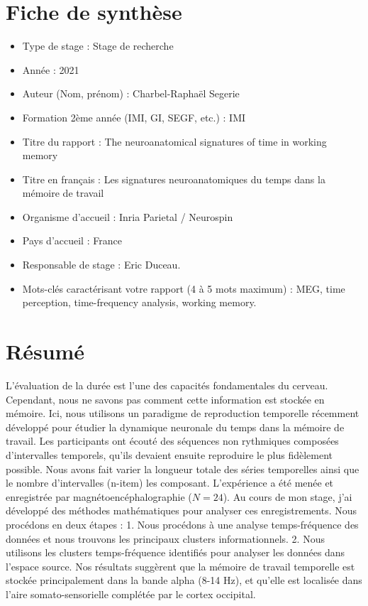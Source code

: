 \chapter*{\centering Fiche de synthèse}
\begin{itemize}
    \item Type de stage : Stage de recherche
    \item Année : 2021
    \item Auteur (Nom, prénom) : Charbel-Raphaël Segerie
    \item Formation 2ème année (IMI, GI, SEGF, etc.) : IMI
    \item Titre du rapport : The neuroanatomical signatures of time in working memory
    \item Titre en français : Les signatures neuroanatomiques du temps dans la mémoire de travail
    \item Organisme d’accueil : Inria Parietal / Neurospin
    \item Pays d’accueil : France
    \item Responsable de stage : Eric Duceau.
    \item Mots-clés caractérisant votre rapport (4 à 5 mots maximum) : MEG, time perception, time-frequency analysis, working memory.
\end{itemize}




\chapter*{\centering Résumé}

L'évaluation de la durée est l'une des capacités fondamentales du cerveau. Cependant, nous ne savons pas comment cette information est stockée en mémoire. Ici, nous utilisons un paradigme de reproduction temporelle récemment développé pour étudier la dynamique neuronale du temps dans la mémoire de travail. Les participants ont écouté des séquences non rythmiques composées d'intervalles temporels, qu'ils devaient ensuite reproduire le plus fidèlement possible. Nous avons fait varier la longueur totale des séries temporelles ainsi que le nombre d'intervalles (n-item) les composant. L'expérience a été menée et enregistrée par magnétoencéphalographie ($N=24$). Au cours de mon stage, j'ai développé des méthodes mathématiques pour analyser ces enregistrements. Nous procédons en deux étapes : 1. Nous procédons à une analyse temps-fréquence des données et nous trouvons les principaux clusters informationnels. 2. Nous utilisons les clusters temps-fréquence identifiés pour analyser les données dans l'espace source. Nos résultats suggèrent que la mémoire de travail temporelle est stockée principalement dans la bande alpha (8-14 Hz), et qu'elle est localisée dans l'aire somato-sensorielle complétée par le cortex occipital.

